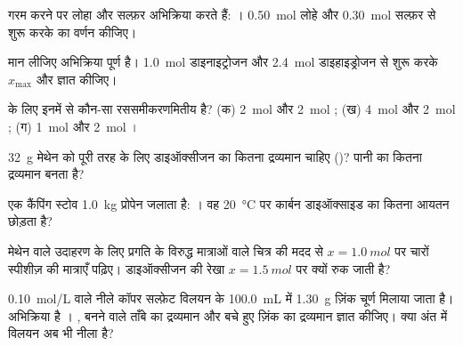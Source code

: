 \begin{exercise}[$\star$]\label{exo:g10:reaction-progress-table:3}
गरम करने पर लोहा और सल्फ़र अभिक्रिया करते हैं: ।
\qty{0.50}{mol} लोहे और \qty{0.30}{mol} सल्फ़र से शुरू करके
 का वर्णन कीजिए।
\end{exercise}

\begin{exercise}[$\star$]\label{exo:g10:reaction-progress-table:4}
मान लीजिए अभिक्रिया  पूर्ण है।
\qty{1.0}{mol} डाइनाइट्रोजन और \qty{2.4}{mol} डाइहाइड्रोजन से शुरू करके
$x_{\max}$ और  ज्ञात कीजिए।
\end{exercise}

\begin{exercise}[$\star$]\label{exo:g10:reaction-progress-table:5}
 के लिए इनमें से कौन-सा  रससमीकरणमितीय है?
(क) \qty{2}{mol}  और \qty{2}{mol} ; (ख) \qty{4}{mol}
 और \qty{2}{mol} ; (ग) \qty{1}{mol}  और
\qty{2}{mol} ।
\end{exercise}

\begin{exercise}[$\star\star$]\label{exo:g10:reaction-progress-table:6}
\qty{32}{g} मेथेन को पूरी तरह  के लिए डाइऑक्सीजन का कितना द्रव्यमान चाहिए
()? पानी का कितना द्रव्यमान बनता है?
\end{exercise}

\begin{exercise}[$\star\star$]\label{exo:g10:reaction-progress-table:7}
एक कैंपिंग स्टोव \qty{1.0}{kg} प्रोपेन जलाता है:
। वह \qty{20}{\celsius} पर कार्बन डाइऑक्साइड
का कितना आयतन छोड़ता है?
\end{exercise}

\begin{exercise}[$\star\star$]\label{exo:g10:reaction-progress-table:8}
मेथेन वाले उदाहरण के लिए प्रगति के विरुद्ध मात्राओं वाले चित्र की मदद से
$x = \qty{1.0}{mol}$ पर चारों स्पीशीज़ की मात्राएँ पढ़िए।
डाइऑक्सीजन की रेखा $x = \qty{1.5}{mol}$ पर क्यों रुक जाती है?
\end{exercise}

\begin{exercise}[$\star\star$]\label{exo:g10:reaction-progress-table:9}
\qty{0.10}{mol/L} वाले नीले कॉपर सल्फ़ेट विलयन के \qty{100.0}{mL} में
\qty{1.30}{g} ज़िंक चूर्ण मिलाया जाता है। अभिक्रिया है
।
, बनने वाले ताँबे का द्रव्यमान और बचे हुए ज़िंक का द्रव्यमान ज्ञात
कीजिए। क्या अंत में विलयन अब भी नीला है?
\end{exercise}

